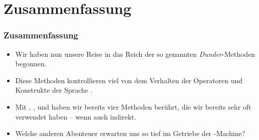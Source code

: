\documentclass[aspectratio=169,mathserif,notheorems]{beamer}%
\begin{document}
\section{Zusammenfassung}%
%
\begin{frame}[t]%
\frametitle{Zusammenfassung}%
%
\begin{itemize}%
\item Wir haben nun unsere Reise in das Reich der so genannten \emph{Dunder}-Methoden begonnen.%
%
\item<2-> Diese Methoden kontrollieren viel von dem Verhalten der Operatoren und Konstrukte der Sprache \python.%
%
\item<3-> Mit , ,  und  haben wir bereits vier Methoden berührt, die wir bereits sehr oft verwendet haben -- wenn auch indirekt.%
%
\item<4-> Welche anderen Abenteuer erwarten uns so tief im Getriebe der \python-Machine?%
\end{itemize}%
\end{frame}%
%
\endPresentation%
\end{document}
